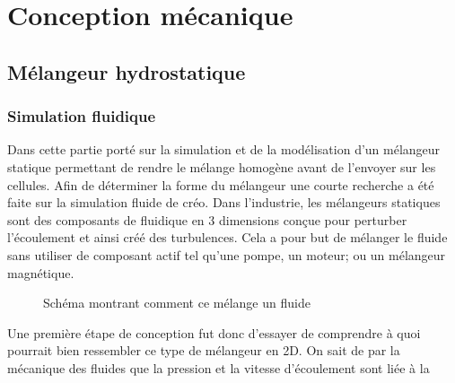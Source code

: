 \documentclass[a4paper, 11pt]{article}
\begin{document}
\newpage
\section{Conception mécanique}
\subsection{Mélangeur hydrostatique}
\subsubsection{Simulation fluidique}
Dans cette partie porté sur la simulation et de la modélisation d'un mélangeur statique
permettant de rendre le mélange homogène avant de l'envoyer sur les cellules.
Afin de déterminer la forme du mélangeur une courte recherche a été faite sur la simulation fluide de créo.
Dans l'industrie, les mélangeurs statiques sont des composants de fluidique en 3 dimensions conçue pour
perturber l'écoulement et ainsi créé des turbulences.
Cela a pour but de mélanger le fluide sans utiliser de composant actif tel qu'une pompe, un moteur;
ou un mélangeur magnétique.
\begin{figure}[H]
    \centering
    \caption{Schéma montrant comment ce mélange un fluide}
    \label{fig:simulation1}
\end{figure}
Une première étape de conception fut donc d'essayer de comprendre à quoi pourrait bien ressembler ce
type de mélangeur en 2D.
On sait de par la mécanique des fluides que la pression et la vitesse d'écoulement sont liée à la
\end{document}
